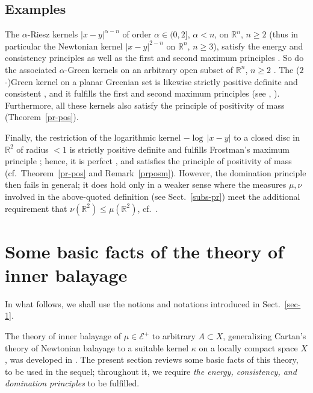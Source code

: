 \documentclass[12pt,a4paper,reqno]{amsart} %
\theoremstyle{lause}
\theoremstyle{maaritelma}
\theoremstyle{lause}
\theoremstyle{maaritelma}
\numberwithin{equation}{section}
\begin{document}
\subsection{Examples}\label{rem:clas} The $\alpha$-Riesz kernels $|x-y|^{\alpha-n}$ of order $\alpha\in(0,2]$, $\alpha<n$, on $\mathbb R^n$, $n\geqslant2$ (thus in particular the Newtonian kernel $|x-y|^{2-n}$ on $\mathbb R^n$, $n\geqslant3$), satisfy the energy and consistency principles as well as the first and second maximum principles \cite[Theorems~1.10, 1.15, 1.18, 1.27, 1.29]{L}. So do the associated $\alpha$-Green kernels on an arbitrary open subset of $\mathbb R^n$, $n\geqslant2$ \cite[Theorems~4.6, 4.9, 4.11]{FZ}. The ($2$-)Green kernel on a planar Greenian set is likewise strictly positive definite \cite[Section~I.XIII.7]{Doob} and consistent \cite{E}, and it fulfills the first and second maximum principles (see \cite[Theorem~5.1.11]{AG}, \cite[Section~I.V.10]{Doob}). Furthermore, all these kernels also satisfy the principle of positivity of mass (Theorem~\ref{pr-pos}).

Finally, the restriction of the logarithmic kernel $-\log\,|x-y|$ to a closed disc in $\mathbb R^2$ of radius ${}<1$ is strictly positive definite and fulfills Frostman's maximum principle \cite[Theorems~1.6, 1.16]{L}; hence, it is perfect \cite[Theorem~3.4.2]{F1}, and satisfies the principle of positivity of mass (cf.\ Theorem~\ref{pr-pos} and Remark~\ref{prposm}). However, the domination principle then fails in general; it does hold only in a weaker sense where the measures $\mu,\nu$ involved in the ab\-ove-quo\-ted definition (see Sect.~\ref{subs-pr}) meet the additional requirement that $\nu(\mathbb R^2)\leqslant\mu(\mathbb R^2)$, cf.\ \cite[Theorem~3.2]{ST}.

\section{Some basic facts of the theory of inner balayage}\label{i1}

In what follows, we shall use the notions and notations introduced in Sect.~\ref{sec-1}.

The theory of inner balayage of $\mu\in\mathcal E^+$ to arbitrary $A\subset X$, generalizing Cartan's theory \cite{Ca2} of Newtonian balayage to a suitable kernel $\kappa$ on a locally compact space $X$, was developed in \cite[Sections~4--8]{Z-arx1}. The present section reviews some basic facts of this theory, to be used in the sequel; throughout it, we require {\it the energy, consistency, and domination principles\/} to be fulfilled.
\end{document}
